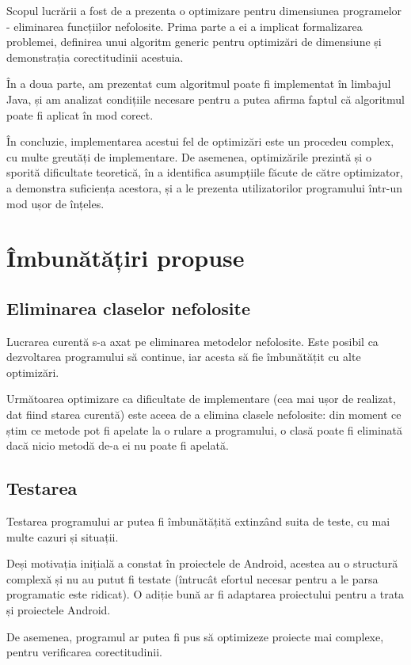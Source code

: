 Scopul lucrării a fost de a prezenta o optimizare pentru dimensiunea
programelor - eliminarea funcțiilor nefolosite.
Prima parte a ei a implicat formalizarea problemei, definirea unui algoritm
generic pentru optimizări de dimensiune și demonstrația
corectitudinii acestuia.

În a doua parte, am prezentat cum algoritmul poate fi implementat în limbajul
Java, și am analizat condițiile necesare pentru a putea afirma faptul că
algoritmul poate fi aplicat în mod corect.

În concluzie, implementarea acestui fel de optimizări este un procedeu complex,
cu multe greutăți de implementare.
De asemenea, optimizările prezintă și o sporită dificultate teoretică, în a
identifica asumpțiile făcute de către optimizator, a demonstra suficiența
acestora, și a le prezenta utilizatorilor programului într-un mod ușor de
înțeles.

\section{Îmbunătățiri propuse}

\subsection{Eliminarea claselor nefolosite}

Lucrarea curentă s-a axat pe eliminarea metodelor nefolosite.
Este posibil ca dezvoltarea programului să continue, iar acesta să fie
îmbunătățit cu alte optimizări.

Următoarea optimizare ca dificultate de implementare (cea mai ușor de realizat,
dat fiind starea curentă) este aceea de a elimina clasele nefolosite:
din moment ce știm ce metode pot fi apelate la o rulare a programului, o clasă
poate fi eliminată dacă nicio metodă de-a ei nu poate fi apelată.

\subsection{Testarea}
Testarea programului ar putea fi îmbunătățită extinzând suita de teste, cu mai
multe cazuri și situații.

Deși motivația inițială a constat în proiectele de Android, acestea au o
structură complexă și nu au putut fi testate (întrucât efortul necesar
pentru a le parsa programatic este ridicat). O adiție bună ar fi adaptarea
proiectului pentru a trata și proiectele Android.

De asemenea, programul ar putea fi pus să optimizeze proiecte mai complexe,
pentru verificarea corectitudinii.


